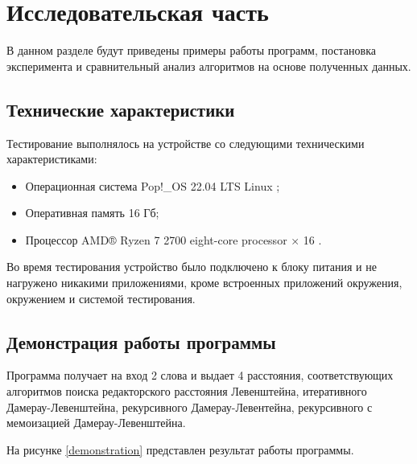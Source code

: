 \chapter{Исследовательская часть}

В данном разделе будут приведены примеры работы программ, постановка эксперимента и сравнительный анализ алгоритмов на основе полученных данных.

\section{Технические характеристики}
Тестирование выполнялось на устройстве со следующими техническими характеристиками:
\begin{itemize}
	\item Операционная система Pop!\_OS 22.04 LTS \cite{ubuntu} Linux \cite{linux};
	\item Оперативная память 16 Гб;
	\item Процессор AMD® Ryzen 7 2700 eight-core processor × 16 \cite{amd}.
\end{itemize}
Во время тестирования устройство было подключено к блоку питания и не нагружено никакими приложениями, кроме встроенных приложений окружения, окружением и системой тестирования.

\section{Демонстрация работы программы}

Программа получает на вход 2 слова и выдает 4 расстояния, соответствующих алгоритмов поиска редакторского расстояния Левенштейна, итеративного Дамерау-Левенштейна, рекурсивного Дамерау-Левентейна, рекурсивного с мемоизацией Дамерау-Левенштейна.

На рисунке \ref{demonstration} представлен результат работы программы.

